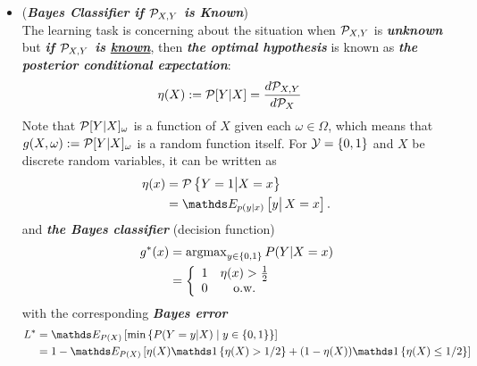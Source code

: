 \documentclass[11pt]{article}
\begin{document}
\begin{itemize}
\item \begin{remark} (\emph{\textbf{Bayes Classifier if ${\mathcal P}_{X, Y}$ is Known}})\\
The learning task is concerning about the situation when ${\mathcal P}_{X, Y}$ is \emph{\textbf{unknown}} but \emph{\textbf{if ${\mathcal P}_{X, Y}$ is \underline{known}}}, then \emph{\textbf{the optimal hypothesis}} is known as \emph{\textbf{the posterior conditional expectation}}:
\begin{align*}
\eta(X) := {\mathcal P}[Y | X] &= \frac{d {\mathcal P}_{X, Y}}{d {\mathcal P}_{X}}
\end{align*} Note that ${\mathcal P}[Y | X]_{\omega}$ is a function of $X$ given each $\omega \in \Omega$, which means that $g(X, \omega) := {\mathcal P}[Y | X]_{\omega}$ is a random function itself.
For ${\mathcal Y} = \left\{0,1\right\}$ and $X$ be discrete random variables, it can be written as 
\begin{align}
\eta(x) &= \cP\set{Y=1 \big| X=x} \nonumber\\
 &= \E{p(y|x)}{y\big|\,X=x}. \label{expr: cond_Prob_fun}
\end{align} 
and \emph{\textbf{the Bayes classifier}} (decision function)
\begin{align}
g^{*}(x)  &= \operatorname{argmax}\limits_{y\in \left\{0,1\right\}}P(Y| X=x)\nonumber\\
&=\left\{ \begin{array}{cc}
1 & \eta(x) > \frac{1}{2} \\ 
0 & \text{o.w.}
\end{array} \right. \label{expr: Bayes_classif}
\end{align} with the corresponding \emph{\textbf{Bayes error}}
\begin{align}
L^{*}&=\E{P(X)}{\min\set{ P(Y=y| X) \;|\; y\in \set{0, 1 }}} \nonumber\\
&= 1- \E{P(X)}{ \eta(X)\ind{\eta(X)>1/2} + (1-\eta(X))\ind{\eta(X)\le 1/2}  }
\end{align}
\end{remark}


\end{itemize}
\end{document}
